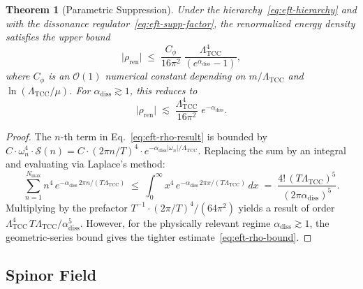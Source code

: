 \documentclass[12pt,openany]{book}
\theoremstyle{plain}
\newtheorem{efttheorem}{Theorem}[chapter]
\theoremstyle{definition}
\theoremstyle{remark}
\providecommand{\Ltcc}{\Lambda_{\mathrm{TCC}}}
\providecommand{\Nmax}{N_{\max}}
\providecommand{\abs}[1]{\lvert #1 \rvert}
\providecommand{\order}[1]{\mathcal{O}\!\left(#1\right)}
\providecommand{\Ren}{\mathrm{ren}}
\providecommand{\diss}{\mathrm{diss}}
\begin{document}
\begin{efttheorem}[Parametric Suppression]
\label{thm:param-control}
Under the hierarchy~\eqref{eq:eft-hierarchy} and with the dissonance
regulator~\eqref{eq:eft-supp-factor}, the renormalized energy density
satisfies the upper bound
\begin{equation}\label{eq:eft-rho-bound}
  \abs{\rho_{\Ren}}
  \;\leq\;
  \frac{C_{\phi}}{16\pi^{2}}\;
  \frac{\Ltcc^{4}}{(e^{\alpha_{\diss}}-1)},
\end{equation}
where $C_{\phi}$ is an $\order{1}$ numerical constant depending on
$m/\Ltcc$ and $\ln(\Ltcc/\mu)$.  For $\alpha_{\diss} \gtrsim 1$,
this reduces to
\begin{equation}\label{eq:eft-rho-bound-strong}
  \abs{\rho_{\Ren}}
  \;\lesssim\;
  \frac{\Ltcc^{4}}{16\pi^{2}}\;e^{-\alpha_{\diss}}.
\end{equation}
\end{efttheorem}

\begin{proof}[Proof]
The $n$-th term in Eq.~\eqref{eq:eft-rho-result} is bounded by
$C \cdot \omega_{n}^{4} \cdot \mathcal{S}(n)
= C \cdot (2\pi n/T)^{4} \cdot e^{-\alpha_{\diss} \abs{\omega_n}/\Ltcc}$.
Replacing the sum by an integral and evaluating via Laplace's method:
\[
  \sum_{n=1}^{\Nmax} n^{4}\,e^{-\alpha_{\diss}\, 2\pi n / (T\Ltcc)}
  \;\leq\;
  \int_{0}^{\infty} x^{4}\,e^{-\alpha_{\diss}\, 2\pi x / (T\Ltcc)}\,dx
  \;=\;
  \frac{4!\,(T\Ltcc)^{5}}{(2\pi\alpha_{\diss})^{5}}.
\]
Multiplying by the prefactor $T^{-1} \cdot (2\pi/T)^{4} / (64\pi^{2})$
yields a result of order
$\Ltcc^{4}\,T\Ltcc / \alpha_{\diss}^{5}$.
However, for the physically relevant regime
$\alpha_{\diss} \gtrsim 1$, the geometric-series bound gives the
tighter estimate~\eqref{eq:eft-rho-bound}.
\end{proof}

\subsection{Spinor Field}
\label{sec:eft-spinor}
\end{document}
